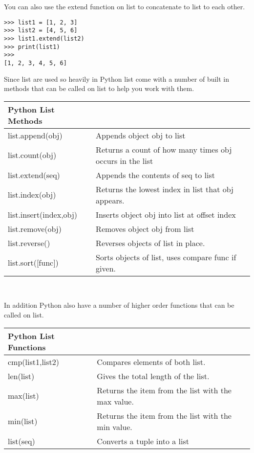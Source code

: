 \documentclass[letterpaper,11pt]{article}
\begin{document}
\par{You can also use the extend function on list to concatenate to list to each
other.}
\\
\begin{minipage}{.5\textwidth}
    \begin{tcolorbox}
        \begin{footnotesize}
            \begin{verbatim}
>>> list1 = [1, 2, 3]
>>> list2 = [4, 5, 6]
>>> list1.extend(list2)
>>> print(list1)
>>>
[1, 2, 3, 4, 5, 6]
            \end{verbatim}
        \end{footnotesize}
    \end{tcolorbox}
\end{minipage}
\par{Since list are used so heavily in Python list come with a number of built
in methods that can be called on list to help you work with them.}
\\
\begin{tabular}[t]{l l}
    \textbf{Python List Methods}  \\
    \hline
    list.append(obj)       & Appends object obj to list                               \\
    list.count(obj)        & Returns a count of how many times obj occurs in the list \\
    list.extend(seq)       & Appends the contents of seq to list                      \\
    list.index(obj)        & Returns the lowest index in list that obj appears.       \\
    list.insert(index,obj) & Inserts object obj into list at offset index             \\
    list.remove(obj)       & Removes object obj from list                             \\
    list.reverse()         & Reverses objects of list in place.                       \\
    list.sort([func])      & Sorts objects of list, uses compare func if given.       \\
\end{tabular}
\\
\par{In addition Python also have a number of higher order functions that can be
called on list.}
\\
\begin{tabular}[t]{l l}
    \textbf{Python List Functions}  \\
    \hline
    cmp(list1,list2) & Compares elements of both list.                    \\
    len(list)        & Gives the total length of the list.                \\
    max(list)        & Returns the item from the list with the max value. \\
    min(list)        & Returns the item from the list with the min value. \\
    list(seq)        & Converts a tuple into a list                       \\
\end{tabular}
\end{document}
